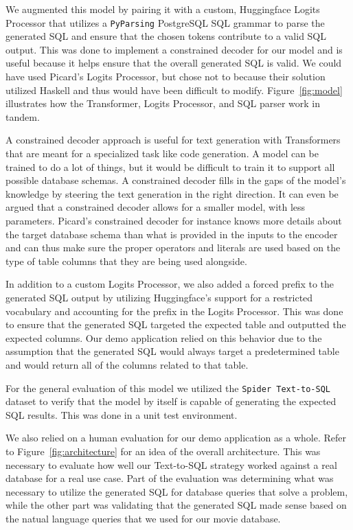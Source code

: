 \documentclass[11pt]{article}
\begin{document}
We augmented this model by pairing it with a custom, Huggingface Logits Processor that utilizes a \texttt{PyParsing} PostgreSQL SQL grammar \citep{githubPyparsing} to parse the generated SQL and ensure that the chosen tokens contribute to a valid SQL output. This was done to implement a constrained decoder for our model and is useful because it helps ensure that the overall generated SQL is valid. We could have used Picard's Logits Processor, but chose not to because their solution utilized Haskell and thus would have been difficult to modify. Figure~\ref{fig:model} illustrates how the Transformer, Logits Processor, and SQL parser work in tandem.

A constrained decoder approach is useful for text generation with Transformers that are meant for a specialized task like code generation. A model can be trained to do a lot of things, but it would be difficult to train it to support all possible database schemas. A constrained decoder fills in the gaps of the model's knowledge by steering the text generation in the right direction. It can even be argued that a constrained decoder allows for a smaller model, with less parameters. Picard's constrained decoder for instance knows more details about the target database schema than what is provided in the inputs to the encoder and can thus make sure the proper operators and literals are used based on the type of table columns that they are being used alongside.

In addition to a custom Logits Processor, we also added a forced prefix to the generated SQL output by utilizing Huggingface's support for a restricted vocabulary and accounting for the prefix in the Logits Processor. This was done to ensure that the generated SQL targeted the expected table and outputted the expected columns. Our demo application relied on this behavior due to the assumption that the generated SQL would always target a predetermined table and would return all of the columns related to that table.

For the general evaluation of this model we utilized the \texttt{Spider Text-to-SQL} dataset \citep{yu2019spider} to verify that the model by itself is capable of generating the expected SQL results. This was done in a unit test environment.

We also relied on a human evaluation for our demo application as a whole. Refer to Figure~\ref{fig:architecture} for an idea of the overall architecture. This was necessary to evaluate how well our Text-to-SQL strategy worked against a real database for a real use case. Part of the evaluation was determining what was necessary to utilize the generated SQL for database queries that solve a problem, while the other part was validating that the generated SQL made sense based on the natual language queries that we used for our movie database.
\end{document}
